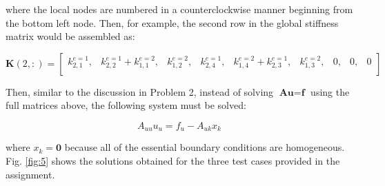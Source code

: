 \documentclass[10pt]{article}
\newcommand{\beq}{\begin{equation}}
\newcommand{\eeq}{\end{equation}}
\begin{document}
where the local nodes are numbered in a counterclockwise manner beginning from the bottom left node. Then, for example, the second row in the global stiffness matrix would be assembled as:

\begin{equation}
\textbf{K}(2,:)=\begin{bmatrix}
k_{2,1}^{e=1}, & k_{2,2}^{e=1}+k_{1,1}^{e=2}, & k_{1,2}^{e=2}, & k_{2,4}^{e=1}, & k_{1,4}^{e=2}+k_{2,3}^{e=1}, & k_{1,3}^{e=2}, & 0, & 0, & 0\\
\end{bmatrix}
\end{equation}

Then, similar to the discussion in Problem 2, instead of solving \(\textbf{A}\textbf{u}=\textbf{f}\) using the full matrices above, the following system must be solved:

\beq
A_{uu}u_u=f_u-A_{uk}x_k
\eeq

where \(x_k=\textbf{0}\) because all of the essential boundary conditions are homogeneous. Fig. \ref{fig:5} shows the solutions obtained for the three test cases provided in the assignment. 
\end{document}
